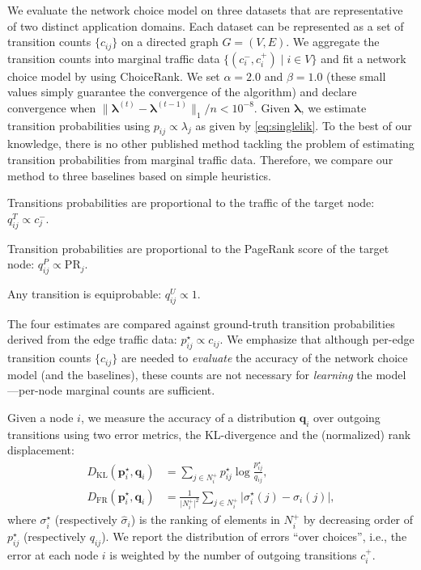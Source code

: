 We evaluate the network choice model on three datasets that are representative of two distinct application domains.
Each dataset can be represented as a set of transition counts $\{ c_{ij} \}$ on a directed graph $G = (V,E)$.
We aggregate the transition counts into marginal traffic data $\{ (c^-_i, c^+_i) \mid i \in V \}$ and fit a network choice model by using ChoiceRank.
We set $\alpha = 2.0$ and $\beta = 1.0$ (these small values simply guarantee the convergence of the algorithm) and declare convergence when $\lVert \bm{\lambda}^{(t)} - \bm{\lambda}^{(t-1)} \rVert_1 / n < 10^{-8}$.
Given $\bm{\lambda}$, we estimate transition probabilities using $p_{ij} \propto \lambda_j$ as given by \eqref{eq:singlelik}.
To the best of our knowledge, there is no other published method tackling the problem of estimating transition probabilities from marginal traffic data.
Therefore, we compare our method to three baselines based on simple heuristics.
\begin{description}[topsep=1ex,itemsep=0ex]
\item[Traffic] Transitions probabilities are proportional to the traffic of the target node: $q_{ij}^T \propto c_j^{-}$.
\item[PageRank] Transition probabilities are proportional to the PageRank score of the target node: $q_{ij}^P \propto \text{PR}_j$.
\item[Uniform] Any transition is equiprobable: $q_{ij}^U \propto 1$.
\end{description}
The four estimates are compared against ground-truth transition probabilities derived from the edge traffic data: $p_{ij}^\star \propto c_{ij}$.
We emphasize that although per-edge transition counts $\{c_{ij}\}$ are needed to \emph{evaluate} the accuracy of the network choice model (and the baselines), these counts are not necessary for \emph{learning} the model---per-node marginal counts are sufficient.

Given a node $i$, we measure the accuracy of a distribution $\bm{q}_i$ over outgoing transitions using two error metrics, the KL-divergence and the (normalized) rank displacement:
\begin{align*}
D_{\text{KL}}(\bm{p}_i^\star, \bm{q}_i) &= \sum_{j \in N^+_i} p^\star_{ij} \log \frac{p^\star_{ij}}{q_{ij}}, \\
D_{\text{FR}}(\bm{p}_i^\star, \bm{q}_i) &= \frac{1}{\vert N^+_i \vert^2} \sum_{j \in N^+_i} \vert \sigma^\star_i(j) - \hat{\sigma}_i(j) \vert,
\end{align*}
where $\sigma^\star_i$ (respectively $\hat{\sigma}_i$) is the ranking of elements in $N^+_i$ by decreasing order of $p^\star_{ij}$ (respectively $q_{ij}$).
We report the distribution of errors ``over choices'', i.e., the error at each node $i$ is weighted by the number of outgoing transitions $c^+_i$.


